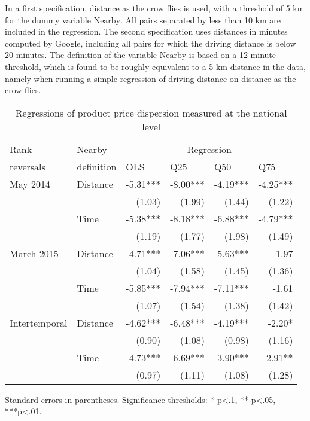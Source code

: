 \documentclass[english]{article}
\begin{document}
In a first specification, distance as the crow flies is used, with a threshold of 5 km for the dummy variable $\text{Nearby}$. All pairs separated by less than 10 km are included in the regression. The second specification uses distances in minutes computed by Google, including all pairs for which the driving distance is below 20 minutes. The definition of the variable $\text{Nearby}$ is based on a 12 minute threshold, which is found to be roughly equivalent to a 5 km distance in the data, namely when running a simple regression of driving distance on distance as the crow flies.

\begin{table}[htbp]
\caption{Regressions of product price dispersion measured at the national level}
\label{tab:reg_rank_reversals}
\begin{threeparttable}
\begin{tabular}{rrrrrr}
    \toprule
    \toprule
    \multicolumn{1}{l}{Rank} & \multicolumn{1}{l}{Nearby} & \multicolumn{4}{c}{Regression} \\
    \multicolumn{1}{l}{reversals} & \multicolumn{1}{l}{definition} & \multicolumn{1}{l}{OLS} & \multicolumn{1}{l}{Q25} & \multicolumn{1}{l}{Q50} & \multicolumn{1}{l}{Q75} \\
    \midrule
    \multicolumn{1}{l}{May 2014} & \multicolumn{1}{l}{Distance} & -5.31*** & -8.00*** & -4.19*** & -4.25*** \\
          &       & (1.03) & (1.99) & (1.44) & (1.22) \\
          & \multicolumn{1}{l}{Time} & -5.38*** & -8.18*** & -6.88*** & -4.79*** \\
          &       & (1.19) & (1.77) & (1.98) & (1.49) \\
    \midrule
    \multicolumn{1}{l}{March 2015} & \multicolumn{1}{l}{Distance} & -4.71*** & -7.06*** & -5.63*** & -1.97 \\
          &       & (1.04) & (1.58) & (1.45) & (1.36) \\
          & \multicolumn{1}{l}{Time} & -5.85*** & -7.94*** & -7.11*** & -1.61 \\
          &       & (1.07) & (1.54) & (1.38) & (1.42) \\
    \midrule
    \multicolumn{1}{l}{Intertemporal} & \multicolumn{1}{l}{Distance} & -4.62*** & -6.48*** & -4.19*** & -2.20* \\
          &       & (0.90) & (1.08) & (0.98) & (1.16) \\
          & \multicolumn{1}{l}{Time} & -4.73*** & -6.69*** & -3.90*** & -2.91** \\
          &       & (0.97) & (1.11) & (1.08) & (1.28) \\
    \bottomrule
    \bottomrule
\end{tabular}
\begin{tablenotes}
      \small
	  \item Standard errors in parentheses. Significance thresholds: * p<.1, ** p<.05, ***p<.01.
\end{tablenotes}
\end{threeparttable}
\end{table}
\end{document}
